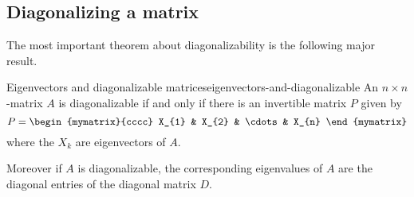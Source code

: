 \subsection{Diagonalizing a matrix}

The most important theorem about diagonalizability is the following major result.

\begin{theorem}{Eigenvectors and diagonalizable matrices}{eigenvectors-and-diagonalizable}
An $n\times n$-matrix $A$ is diagonalizable if and only if there is an
invertible matrix $P$ given by 
\begin{equation*}
P=\begin{mymatrix}{cccc}
X_{1} & X_{2} & \cdots & X_{n}
\end{mymatrix}
\end{equation*}
where the $X_{k}$ are eigenvectors of $A$. 

Moreover if $A$ is diagonalizable, the corresponding eigenvalues of $A$ are the
diagonal entries of the diagonal matrix $D$.
\end{theorem}

